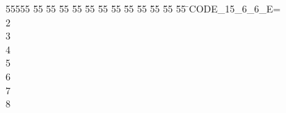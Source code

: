 %
%
\begin{tabbing}
55555 \= 55 \= 55 \= 55 \= 55 \= 55 \= 55 \= 55 \= 55 \= 55 \= 55 \= 55 \= 55 \= \>CODE\_15\_6\_6\_E=\\[0pt]
2\ \\[0pt]
3\ \\[0pt]
4\ \\[0pt]
5\ \\[0pt]
6\ \\[0pt]
7\\[0pt]
8\>\end{tabbing}
